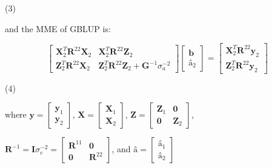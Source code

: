 \documentclass[authordate, empirical]{jote-new-article}
\begin{document}
\vspace{-1.5\baselineskip}
\begin{center}
		(3)
	\end{center}

	\noindent and the MME of GBLUP is:


	\begin{equation*}
		\begin{bmatrix}
		\textbf{X}_2^T \textbf{R}^{22} \textbf{X}_2&\textbf{X}_2^T \textbf{R}^{22} \textbf{Z}_2\\\textbf{Z}_2^T \textbf{R}^{22} \textbf{X}_2&\textbf{Z}_2^T \textbf{R}^{22} \textbf{Z}_2+\textbf{G}^{-1} \sigma_a^{-2}
		\end{bmatrix}
		\begin{bmatrix}
			\textbf{\^{b}}\\\textbf{\^{a}}_2
		\end{bmatrix}=
		\begin{bmatrix}\textbf{X}_2^T \textbf{R}^{22} \textbf{y}_2\\\textbf{Z}_2^T \textbf{R}^{22} \textbf{y}_2
		\end{bmatrix}
	\end{equation*}
	\vspace{-1.5\baselineskip}
\begin{center}
		(4)
	\end{center}



	\noindent where $\textbf{y}=\begin{bmatrix}
			\textbf{y}_1\\\textbf{y}_2
		\end{bmatrix}$, $\textbf{X}=\begin{bmatrix}
			\textbf{X}_1\\\textbf{X}_2
		\end{bmatrix}$, $\textbf{Z}=\begin{bmatrix}
			\textbf{Z}_1&\textbf{0}\\\textbf{0}&\textbf{Z}_2
		\end{bmatrix}$, 
		
		\noindent$\textbf{R}^{-1}=\textbf{I}\sigma_e^{-2}=\begin{bmatrix}
			\textbf{R}^{11}&\textbf{0}\\\textbf{0}&\textbf{R}^{22}
		\end{bmatrix}$, and $\textbf{\^{a}}=\begin{bmatrix}
			\textbf{\^{a}}_1\\\textbf{\^{a}}_2
		\end{bmatrix}$
		
\end{document}
